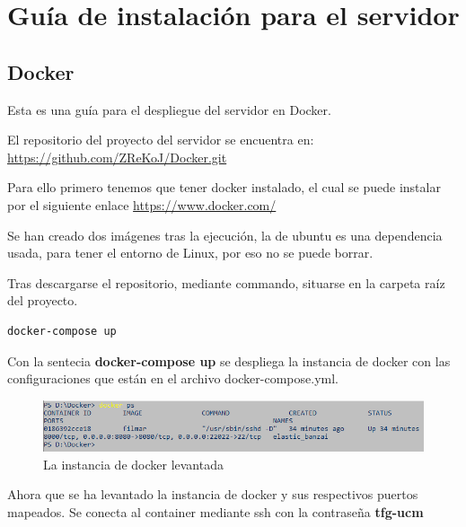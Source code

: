 
\cleardoublepage

\chapter{Guía de instalación para el servidor}
\label{Appendix:Key1}

\section{Docker}
\label{makereference7.1}
Esta es una guía para el despliegue del servidor en Docker.

El repositorio del proyecto del servidor se encuentra en:
\url{https://github.com/ZReKoJ/Docker.git}

Para ello primero tenemos que tener docker instalado, el cual 
se puede instalar por el siguiente enlace \url{https://www.docker.com/}

Se han creado dos imágenes tras la ejecución, la de ubuntu es una dependencia usada, para tener el entorno de Linux, por eso no se puede borrar.

Tras descargarse el repositorio, mediante commando, situarse en la carpeta raíz del proyecto.

\begin{lstlisting}[language=bash, caption=Levantamiento de la instancia de docker]
    docker-compose up
\end{lstlisting}

Con la sentecia \textbf{docker-compose up} se despliega la instancia de docker con las configuraciones 
que están en el archivo docker-compose.yml.

\begin{figure}[H]
    \centering
    \includegraphics[width=6in]{figures/appendix-A/list-docker-containers.png}
    \caption{La instancia de docker levantada}
\end{figure}

Ahora que se ha levantado la instancia de docker y sus respectivos puertos mapeados.
Se conecta al container mediante ssh con la contraseña \textbf{tfg-ucm}

